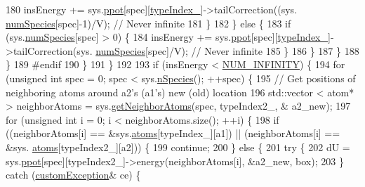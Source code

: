 \begin{DoxyCode}
180                             insEnergy += sys.\hyperlink{classsim_system_ad2e290b5963f132e6a3a56cee35c8e9f}{ppot}[spec][\hyperlink{classmc_move_acb731965547b0326ef318ec96da8b46a}{typeIndex\_}]->tailCorrection((sys.
      \hyperlink{classsim_system_a9eea865e6dc1cff377b1e79c4d9c23f0}{numSpecies}[spec]-1)/V); \textcolor{comment}{// Never infinite}
181                         \}
182                     \} \textcolor{keywordflow}{else} \{
183                         \textcolor{keywordflow}{if} (sys.\hyperlink{classsim_system_a9eea865e6dc1cff377b1e79c4d9c23f0}{numSpecies}[spec] > 0) \{
184                             insEnergy += sys.\hyperlink{classsim_system_ad2e290b5963f132e6a3a56cee35c8e9f}{ppot}[spec][\hyperlink{classmc_move_acb731965547b0326ef318ec96da8b46a}{typeIndex\_}]->tailCorrection(sys.
      \hyperlink{classsim_system_a9eea865e6dc1cff377b1e79c4d9c23f0}{numSpecies}[spec]/V); \textcolor{comment}{// Never infinite}
185                         \}
186                     \}
187                 \}
188             \}
189 \textcolor{preprocessor}{    #endif}
190 \textcolor{preprocessor}{}        \}
191     \}
192 
193     \textcolor{keywordflow}{if} (insEnergy < \hyperlink{potentials_8h_ab94ab1d09e2291d03fe92a0e24a9d33b}{NUM\_INFINITY}) \{
194         \textcolor{keywordflow}{for} (\textcolor{keywordtype}{unsigned} \textcolor{keywordtype}{int} spec = 0; spec < sys.\hyperlink{classsim_system_ab5e2e9b6204de15520302fe1d51688dd}{nSpecies}(); ++spec) \{
195             \textcolor{comment}{// Get positions of neighboring atoms around a2's (a1's) new (old) location}
196             std::vector < atom* > neighborAtoms = sys.\hyperlink{classsim_system_a9b3aeefa22c3b50b5913df6eea753bc6}{getNeighborAtoms}(spec, typeIndex2\_, &
      a2\_new);
197             \textcolor{keywordflow}{for} (\textcolor{keywordtype}{unsigned} \textcolor{keywordtype}{int} i = 0; i < neighborAtoms.size(); ++i) \{
198                 \textcolor{keywordflow}{if} ((neighborAtoms[i] == &sys.\hyperlink{classsim_system_a90421b19082f7fb8fc23b7264b1161e4}{atoms}[typeIndex\_][a1]) || (neighborAtoms[i] == &sys.
      \hyperlink{classsim_system_a90421b19082f7fb8fc23b7264b1161e4}{atoms}[typeIndex2\_][a2])) \{
199                     \textcolor{keywordflow}{continue};
200                 \} \textcolor{keywordflow}{else} \{
201                     \textcolor{keywordflow}{try} \{
202                         dU = sys.\hyperlink{classsim_system_ad2e290b5963f132e6a3a56cee35c8e9f}{ppot}[spec][typeIndex2\_]->energy(neighborAtoms[i], &a2\_new, box);
203                     \} \textcolor{keywordflow}{catch} (\hyperlink{classcustom_exception}{customException}& ce) \{

\end{DoxyCode}
